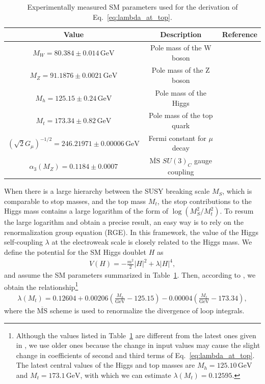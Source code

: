 \documentclass[12pt,twoside,book]{article}
\begin{document}
\begin{table}[t]
  \centering
  \begin{tabular}{ccc}
    Value & Description & Reference\\ \hline
    $M_W = 80.384 \pm 0.014\, \mathrm{GeV}$ & Pole mass of the W boson
      & \cite{Group:2012gb,Alcaraz:1016509} \\
    $M_Z = 91.1876 \pm 0.0021\, \mathrm{GeV}$ & Pole mass of the Z boson
      & \cite{Beringer:1900zz} \\
    $M_h = 125.15 \pm 0.24\, \mathrm{GeV}$ & Pole mass of the Higgs
      & \cite{Aad:2013wqa,Chatrchyan:2013mxa} \\
    $M_t = 173.34 \pm 0.82\, \mathrm{GeV}$ & Pole mass of the top quark
      & \cite{ATLAS:2014wva} \\
    $\left( \sqrt{2} G_\mu \right)^{-1/2} = 246.21971 \pm 0.00006\, \mathrm{GeV}$
      & Fermi constant for $\mu$ decay & \cite{Tishchenko:2012ie} \\
    $\alpha_3 (M_Z) = 0.1184 \pm 0.0007$
      & $\overline{\mathrm{MS}}$ $SU(3)_C$ gauge coupling & \cite{Bethke:2012jm}
  \end{tabular}
  \caption{Experimentally measured SM parameters used for the derivation of Eq.~\eqref{eq:lambda_at_top}.}
  \label{tab:SM_param}
\end{table}

When there is a large hierarchy between the SUSY breaking scale $M_S$, which is comparable to stop masses, and the top mass $M_t$, the stop contributions to the Higgs mass contains a large logarithm of the form of $\log \left( M_S^2 / M_t^2 \right)$.
To resum the large logarithm and obtain a precise result, an easy way is to rely on the renormalization group equation (RGE).
In this framework, the value of the Higgs self-coupling $\lambda$ at the electroweak scale is closely related to the Higgs mass.
We define the potential for the SM Higgs doublet $H$ as
\begin{align}
  V(H) = -\frac{m^2}{2} |H|^2 + \lambda |H|^4,
\end{align}
and assume the SM parameters summarized in Table~\ref{tab:SM_param}.
Then, according to \cite{Buttazzo:2013uya}, we obtain the relationship\footnote
{
  Although the values listed in Table~\ref{tab:SM_param} are different from the latest ones given in \cite{Tanabashi:2018oca}, we use older ones because the change in input values may cause the slight change in coefficients of second and third terms of Eq.~\eqref{eq:lambda_at_top}.
  The latest central values of the Higgs and top masses are $M_h = 125.10\,\mathrm{GeV}$ and $M_t = 173.1\,\mathrm{GeV}$, with which we can estimate $\lambda (M_t) = 0.12595$.
}
\begin{align}
  \lambda (M_t) = 0.12604
  + 0.00206 \left( \frac{M_h}{\mathrm{GeV}} - 125.15 \right)
  - 0.00004 \left( \frac{M_t}{\mathrm{GeV}} - 173.34 \right),
  \label{eq:lambda_at_top}
\end{align}
where the $\overline{\mathrm{MS}}$ scheme is used to renormalize the divergence of loop integrals.
\end{document}
